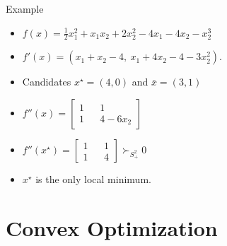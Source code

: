 \documentclass[9pt]{beamer}
\begin{document}
\begin{frame}{Example}

  \begin{itemize}
    \setlength\itemsep{1.5em}
  \item $f(x) =\frac{1}{2} x_1^2 +x_1 x_2 +2 x_2^2 -4x_1-4 x_2-x_2^3$\\
  \item $f'(x)= (x_1+x_2-4,~x_1+4x_2-4-3x_2^2)$. \\
  \item Candidates $x^\star=(4,0)$ and $\bar{x}=(3,1)$
  \item $f''( x) =\left[
      \begin{array}{ccc}
        1  & & 1   \\
        1 & & 4-6 x_2
      \end{array}
    \right]$
  \item $f''(x^\star) =\left[
      \begin{array}{ccc}
        1  & & 1   \\
        1 & & 4
      \end{array}
    \right]\succ_{S^2_+} 0$
  \item $x^\star$ is the only local minimum.
  \end{itemize}
\end{frame}

\section{Convex Optimization}
\end{document}
